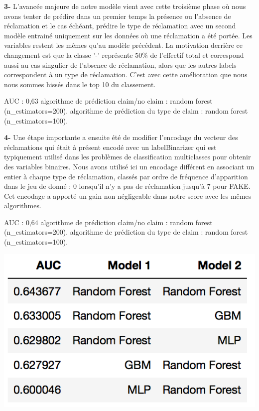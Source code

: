 \textbf{3-} L'avancée majeure de notre modèle vient avec cette troisième phase où nous avons
tenter de prédire dans un premier temps la présence ou l'absence de réclamation et le cas 
échéant, prédire le type de réclamation avec un second modèle entrainé uniquement sur les
données où une réclamation a été portée. Les variables restent les mêmes qu'au modèle
précédent. La motivation derrière ce changement est que la classe '-' représente 50\%
de l'effectif total et correspond aussi au cas singulier de l'absence de réclamation, 
alors que les autres labels correspondent à un type de réclamation.
C'est avec cette amélioration que nous nous sommes hissés dans le top 10 du classement.

AUC : 0,63
algorithme de prédiction claim/no claim : random forest (n_estimators=200).
algorithme de prédiction du type de claim : random forest (n_estimators=100).

\textbf{4-} Une étape importante a ensuite été de modifier l'encodage du vecteur des
réclamations qui était à présent encodé avec un labelBinarizer qui est typiquement utilisé
dans les problèmes de classification multiclasses pour obtenir des variables binaires.
Nous avons utilisé ici un encodage différent en associant un entier à chaque type de
réclamation, classés par ordre de fréquence d'apparition dans le jeu de donné : 0 lorsqu'il
n'y a pas de réclamation jusqu'à 7 pour FAKE. Cet encodage a apporté un gain non négligeable
dans notre score avec les mêmes algorithmes.

AUC : 0,64
algorithme de prédiction claim/no claim : random forest (n_estimators=200).
algorithme de prédiction du type de claim : random forest (n_estimators=100).

\begin{center}
\includegraphics[scale=0.5]{assets/auc2} 
\end{center}

